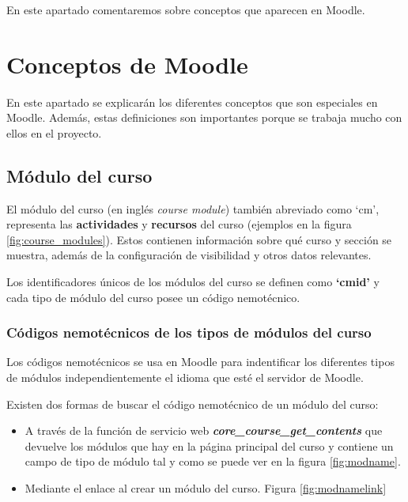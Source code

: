 
En este apartado comentaremos sobre conceptos que aparecen en Moodle.



\section{Conceptos de Moodle}

En este apartado se explicarán los diferentes conceptos que son especiales en Moodle. Además, estas definiciones son importantes porque se trabaja mucho con ellos en el proyecto.

\subsection{Módulo del curso}
El módulo del curso \cite{noauthor_course_nodate} (en inglés \textit{course module}) también abreviado como `cm', representa las \textbf{actividades} y \textbf{recursos} del curso (ejemplos en la figura \ref{fig:course_modules}). Estos contienen información sobre qué curso y sección se muestra, además de la configuración de visibilidad y otros datos relevantes. 


Los identificadores únicos de los módulos del curso se definen como \textbf{`cmid'} y cada tipo de módulo del curso posee un código nemotécnico.


\subsubsection{Códigos nemotécnicos de los tipos de módulos del curso}
Los códigos nemotécnicos se usa en Moodle para indentificar los diferentes tipos de módulos independientemente el idioma que esté el servidor de Moodle.

Existen dos formas de buscar el código nemotécnico de un módulo del curso:
\begin{itemize}
	\item A través de la función de servicio web \textbf{\textit{core\_course\_get\_contents}} que devuelve los módulos que hay en la página principal del curso y contiene un campo de tipo de módulo tal y como se puede ver en la figura \ref{fig:modname}.
	
	\item Mediante el enlace al crear un módulo del curso. Figura \ref{fig:modnamelink}
	
\end{itemize}

